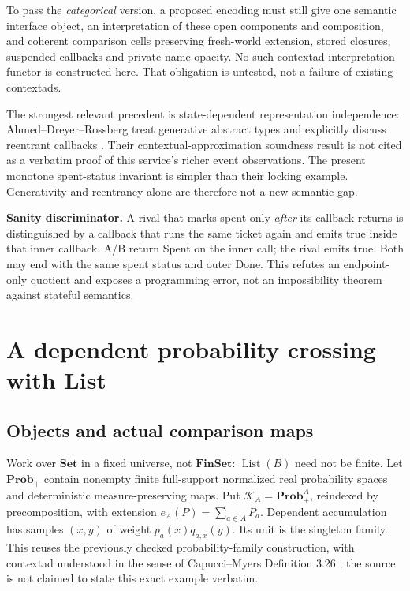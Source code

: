 \documentclass[11pt,a4paper]{article}
\newcommand{\List}{\operatorname{List}}
\newcommand{\Prob}{\mathbf{Prob}_{+}}
\newcommand{\Set}{\mathbf{Set}}
\begin{document}
To pass the \emph{categorical} version, a proposed encoding must still give one
semantic interface object, an interpretation of these open components and
composition, and coherent comparison cells preserving fresh-world extension,
stored closures, suspended callbacks and private-name opacity. No such
contextad interpretation functor is constructed here. That obligation is
untested, not a failure of existing contextads.

The strongest relevant precedent is state-dependent representation independence:
Ahmed--Dreyer--Rossberg treat generative abstract types and explicitly discuss
reentrant callbacks \cite{ADR}. Their contextual-approximation soundness result
is not cited as a verbatim proof of this service's richer event observations.
The present monotone spent-status invariant is simpler than their locking
example. Generativity and reentrancy alone are therefore not a new semantic gap.

\textbf{Sanity discriminator.} A rival that marks spent only \emph{after} its
callback returns is distinguished by a callback that runs the same ticket again
and emits true inside that inner callback. A/B return Spent on the inner call;
the rival emits true. Both may end with the same spent status and outer Done.
This refutes an endpoint-only quotient and exposes a programming error, not an
impossibility theorem against stateful semantics.

\section{A dependent probability crossing with List}

\subsection{Objects and actual comparison maps}

Work over \(\Set\) in a fixed universe, not \(\mathbf{FinSet}\):
\(\List(B)\) need not be finite. Let \(\Prob\) contain nonempty finite
full-support normalized real probability spaces and deterministic
measure-preserving maps. Put \(\mathcal K_A=\Prob^A\), reindexed by
precomposition, with extension \(e_A(P)=\sum_{a\in A}P_a\).
Dependent accumulation has samples \((x,y)\) of weight
\(p_a(x)q_{a,x}(y)\). Its unit is the singleton family. This reuses the
previously checked probability-family construction, with contextad understood
in the sense of Capucci--Myers Definition 3.26 \cite{CM}; the source is not
claimed to state this exact example verbatim.
\end{document}
